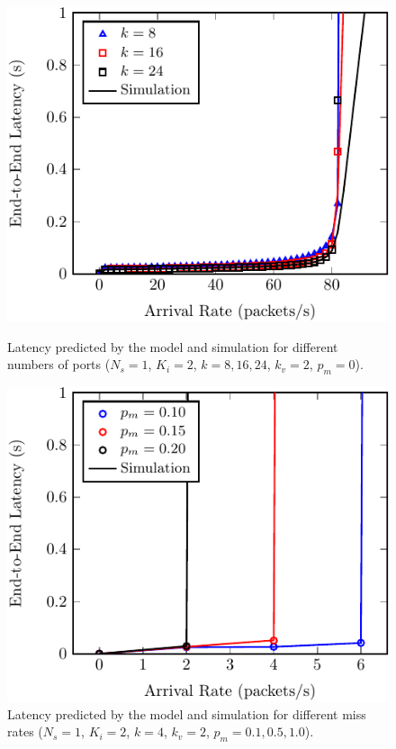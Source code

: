 
\begin{figure}
	\centering
	\begin{minipage}[b]{.49\textwidth}
		\includegraphics[width=\linewidth]{graphs/num_ports-crop}
		\caption{Latency predicted by the model and simulation for different numbers
		of ports ($N_s=1$, $K_i=2$, $k={8,16,24}$, $k_v=2$, $p_m=0$).}
		\label{fig:num_ports}
	\end{minipage}
	\hfill
	\begin{minipage}[b]{.49\textwidth}
		\includegraphics[width=\linewidth]{graphs/diff_sdn-crop}
		\caption{Latency predicted by the model and simulation for different miss rates ($N_s=1$, $K_i=2$, $k=4$, $k_v=2$, $p_m={0.1,0.5,1.0}$).}
		\label{fig:sdn_perc}
	\end{minipage}


\end{figure}
